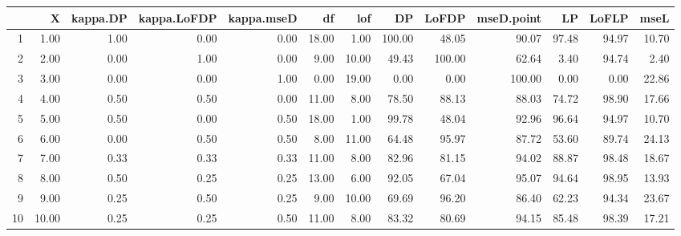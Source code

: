 \begin{table}[ht]
\centering
\begin{tabular}{rrrrrrrrrrrrr}
  \hline
 & X & kappa.DP & kappa.LoFDP & kappa.mseD & df & lof & DP & LoFDP & mseD.point & LP & LoFLP & mseL \\ 
  \hline
1 & 1.00 & 1.00 & 0.00 & 0.00 & 18.00 & 1.00 & 100.00 & 48.05 & 90.07 & 97.48 & 94.97 & 10.70 \\ 
  2 & 2.00 & 0.00 & 1.00 & 0.00 & 9.00 & 10.00 & 49.43 & 100.00 & 62.64 & 3.40 & 94.74 & 2.40 \\ 
  3 & 3.00 & 0.00 & 0.00 & 1.00 & 0.00 & 19.00 & 0.00 & 0.00 & 100.00 & 0.00 & 0.00 & 22.86 \\ 
  4 & 4.00 & 0.50 & 0.50 & 0.00 & 11.00 & 8.00 & 78.50 & 88.13 & 88.03 & 74.72 & 98.90 & 17.66 \\ 
  5 & 5.00 & 0.50 & 0.00 & 0.50 & 18.00 & 1.00 & 99.78 & 48.04 & 92.96 & 96.64 & 94.97 & 10.70 \\ 
  6 & 6.00 & 0.00 & 0.50 & 0.50 & 8.00 & 11.00 & 64.48 & 95.97 & 87.72 & 53.60 & 89.74 & 24.13 \\ 
  7 & 7.00 & 0.33 & 0.33 & 0.33 & 11.00 & 8.00 & 82.96 & 81.15 & 94.02 & 88.87 & 98.48 & 18.67 \\ 
  8 & 8.00 & 0.50 & 0.25 & 0.25 & 13.00 & 6.00 & 92.05 & 67.04 & 95.07 & 94.64 & 98.95 & 13.93 \\ 
  9 & 9.00 & 0.25 & 0.50 & 0.25 & 9.00 & 10.00 & 69.69 & 96.20 & 86.40 & 62.23 & 94.34 & 23.67 \\ 
  10 & 10.00 & 0.25 & 0.25 & 0.50 & 11.00 & 8.00 & 83.32 & 80.69 & 94.15 & 85.48 & 98.39 & 17.21 \\ 
   \hline
\end{tabular}
\end{table}
